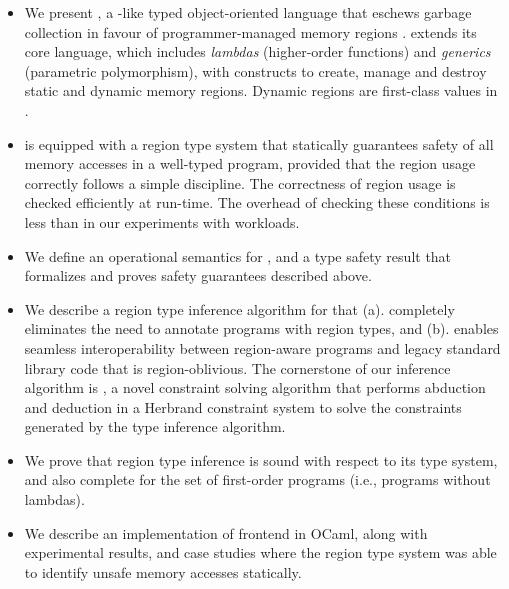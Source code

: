 \begin{itemize}
  \item We present \name, a \csharp-like typed object-oriented language
  that eschews garbage collection in favour of programmer-managed
  memory regions . \name extends its core language, which includes
  \emph{lambdas} (higher-order functions) and \emph{generics}
  (parametric polymorphism), with constructs to create, manage and
  destroy static and dynamic memory regions. Dynamic regions are
  first-class values in \name.

  \item \name is equipped with a region type system that statically
  guarantees safety of all memory accesses in a well-typed program,
  provided that the region usage correctly follows a simple discipline.
  The correctness of region usage is checked efficiently at run-time.
  The overhead of checking these conditions is less than
   in our experiments with \naiad workloads.

  \item We define an operational semantics for \name, and a type
  safety result that formalizes and proves safety guarantees described
  above.

  \item We describe a region type inference algorithm for \name that
  (a). completely eliminates the need to annotate \name programs with
  region types, and (b). enables seamless interoperability between
  region-aware \name programs and legacy standard library code that is
  region-oblivious. The cornerstone of our inference algorithm is
  \csolve, a novel constraint solving algorithm that performs
  abduction and deduction in a Herbrand constraint system to solve the
  constraints generated by the type inference algorithm.

  \item We prove that region type inference is sound with respect to
  its type system, and also complete for the set of first-order
  programs (i.e., programs without lambdas). 

  \item We describe an implementation of \name frontend in OCaml,
  along with experimental results, and case studies where the region
  type system was able to identify unsafe memory accesses statically.
  
\end{itemize}

